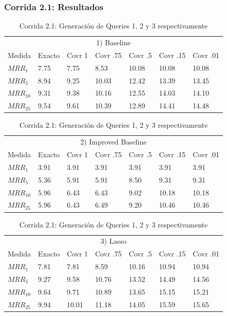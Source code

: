 \begin{frame}
\frametitle{Corrida 2.1: Resultados}


\begin{table}
\centering
\begin{center}
\begin{tabular}{|l | l | l | l | l | l | l |}

\multicolumn{7}{|c|}{1) Baseline}  \\ 
Medida & Exacto & Covr 1 & Covr .75 & Covr .5 & Covr .15 & Covr .01 \\ 

$MRR_{1}$ & 7.75 & 7.75 & 8.53 & 10.08 & 10.08 & 10.08  \\ 
$MRR_{5}$ & 8.94 & 9.25 & 10.03 & 12.42 & 13.39 & 13.45  \\ 
$MRR_{10}$ & 9.31 & 9.38 & 10.16 & 12.55 & 14.03 & 14.10  \\ 
$MRR_{25}$ & 9.54 & 9.61 & 10.39 & 12.89 & 14.41 & 14.48  \\ 
\end{tabular}

\medskip

\begin{tabular}{|l | l | l | l | l | l | l |}

\multicolumn{7}{|c|}{2) Improved Baseline}  \\ 
Medida & Exacto & Covr 1 & Covr .75 & Covr .5 & Covr .15 & Covr .01 \\ 

$MRR_{1}$ & 3.91 & 3.91 & 3.91 & 3.91 & 3.91 & 3.91  \\ 
$MRR_{5}$ & 5.36 & 5.91 & 5.91 & 8.50 & 9.31 & 9.31  \\ 
$MRR_{10}$ & 5.96 & 6.43 & 6.43 & 9.02 & 10.18 & 10.18  \\ 
$MRR_{25}$ & 5.96 & 6.43 & 6.49 & 9.20 & 10.46 & 10.46  \\ 
\end{tabular}


\medskip

\begin{tabular}{|l | l | l | l | l | l | l |}

\multicolumn{7}{|c|}{3) Lasso}  \\ 
Medida & Exacto & Covr 1 & Covr .75 & Covr .5 & Covr .15 & Covr .01 \\ 

$MRR_{1}$ & 7.81 & 7.81 & 8.59 & 10.16 & 10.94 & 10.94  \\ 
$MRR_{5}$ & 9.27 & 9.58 & 10.76 & 13.52 & 14.49 & 14.56  \\ 
$MRR_{10}$ & 9.64 & 9.71 & 10.89 & 13.65 & 15.15 & 15.21  \\ 
$MRR_{25}$ & 9.94 & 10.01 & 11.18 & 14.05 & 15.59 & 15.65  \\ 
\end{tabular}

\caption{Corrida 2.1: Generación de Queries 1, 2 y 3 respectivamente}
\label{table:2_1_50_40_getExactMRRWikiFactoid_getCovrMRRWikiFactoidx}
\end{center}
\end{table}

\end{frame}




